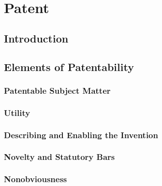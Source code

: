 \section{Patent}

\subsection{Introduction}


\subsection{Elements of Patentability}

\subsubsection{Patentable Subject Matter}





\subsubsection{Utility}


\subsubsection{Describing and Enabling the Invention}




\subsubsection{Novelty and Statutory Bars}





\subsubsection{Nonobviousness}

